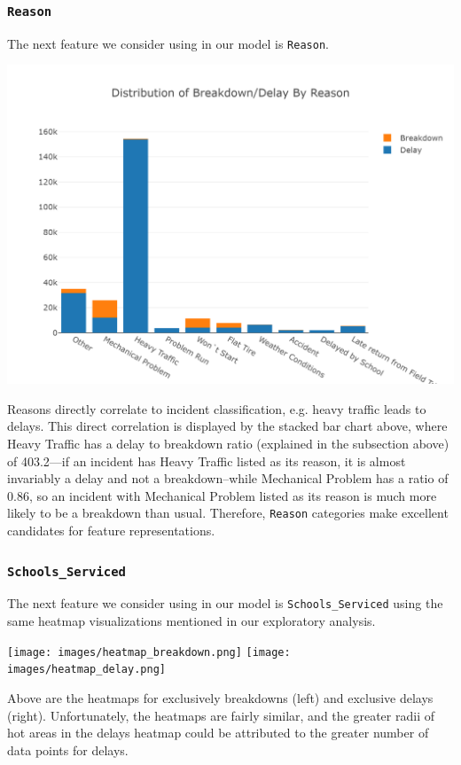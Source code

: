 \documentclass[11pt]{article}
\begin{document}
\subsubsection{\texttt{Reason}}
The next feature we consider using in our model is \texttt{Reason}.
\begin{center}
\includegraphics[width=5.25in]{images/reason_stacked.png}    
\end{center}
Reasons directly correlate to incident classification, e.g. heavy traffic leads to delays. This direct correlation is displayed by the stacked bar chart above, where Heavy Traffic has a delay to breakdown ratio (explained in the subsection above) of 403.2---if an incident has Heavy Traffic listed as its reason, it is almost invariably a delay and not a breakdown--while Mechanical Problem has a ratio of 0.86, so an incident with Mechanical Problem listed as its reason is much more likely to be a breakdown than usual. Therefore, \texttt{Reason} categories make excellent candidates for feature representations.

\subsubsection{\texttt{Schools\_Serviced}}
The next feature we consider using in our model is \texttt{Schools\_Serviced} using the same heatmap visualizations mentioned in our exploratory analysis.
\begin{center}
\texttt{[image: images/heatmap\_breakdown.png]}    
\texttt{[image: images/heatmap\_delay.png]}    
\end{center}
Above are the heatmaps for exclusively breakdowns (left) and exclusive delays (right). Unfortunately, the heatmaps are fairly similar, and the greater radii of hot areas in the delays heatmap could be attributed to the greater number of data points for delays.
\end{document}
